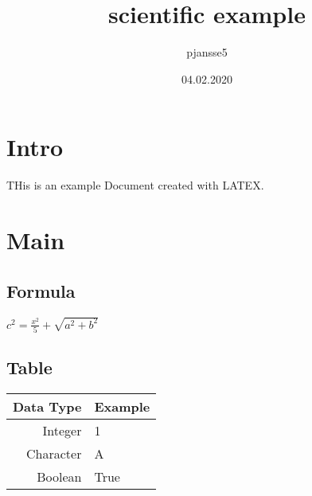 \documentclass{scrartcl}
\date{04.02.2020}
\author{pjansse5}
\title{scientific example}
\begin{document}
\maketitle
\tableofcontents

\section{Intro}
THis is an example Document created with LATEX.
\section{Main}
\subsection{Formula}
$c^{2}=\frac{ x^{2} }{5}+\sqrt{ a^{2}+b^{2} }$
\subsection{Table}
\begin{tabular}[t]{rl}
Data Type & Example\\
\hline
Integer & 1\\
Character & A\\
Boolean & True\\
\end{tabular}
\end{document}
